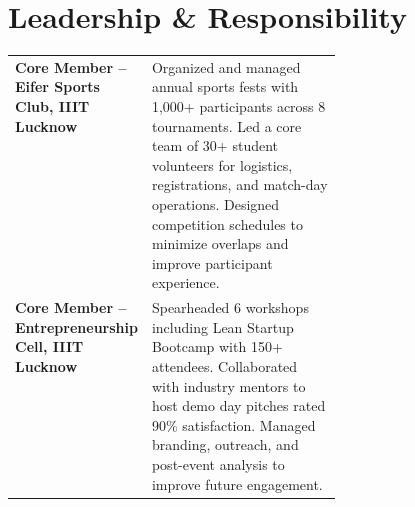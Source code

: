 \documentclass[a4paper,11pt]{article}
\begin{document}
\section{Leadership \& Responsibility}

\begin{tabularx}{\linewidth}{@{}p{0.38\linewidth} X@{}}
\textbf{Core Member -- Eifer Sports Club, IIIT Lucknow} &
Organized and managed annual sports fests with 1,000+ participants across 8 tournaments. Led a core team of 30+ student volunteers for logistics, registrations, and match-day operations. Designed competition schedules to minimize overlaps and improve participant experience. \\[4pt]

\textbf{Core Member -- Entrepreneurship Cell, IIIT Lucknow} &
Spearheaded 6 workshops including Lean Startup Bootcamp with 150+ attendees. Collaborated with industry mentors to host demo day pitches rated 90\% satisfaction. Managed branding, outreach, and post-event analysis to improve future engagement. \\
\end{tabularx}

\vfill
\end{document}
